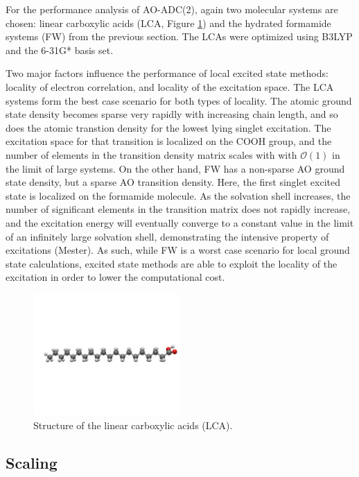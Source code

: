 For the performance analysis of AO-ADC(2), again two molecular systems are chosen: linear carboxylic acids (LCA, Figure \ref{fig:ACID}) and the hydrated formamide systems (FW) from the previous section. The LCAs were optimized using B3LYP and the 6-31G* basis set.

Two major factors influence the performance of local excited state methods: locality of electron correlation, and locality of the excitation space. The LCA systems form the best case scenario for both types of locality. The atomic ground state density becomes sparse very rapidly with increasing chain length, and so does the atomic transtion density for the lowest lying singlet excitation. The excitation space for that transition is localized on the COOH group, and the number of elements in the transition density matrix scales with with $\mathcal{O}(1)$ in the limit of large systems. On the other hand, FW has a non-sparse AO ground state density, but a sparse AO transition density. Here, the first singlet excited state is localized on the formamide molecule. As the solvation shell increases, the number of significant elements in the transition matrix does not rapidly increase, and the excitation energy will eventually converge to a constant value in the limit of an infinitely large solvation shell, demonstrating the intensive property of excitations (Mester). As such, while FW is a worst case scenario for local ground state calculations, excited state methods are able to exploit the locality of the excitation in order to lower the computational cost.   

\begin{figure}
\centering
\includegraphics[width=0.5\textwidth]{Pics/acid.png}
\caption{Structure of the linear carboxylic acids (LCA).}
\label{fig:ACID}
\end{figure}

\subsection{Scaling}

